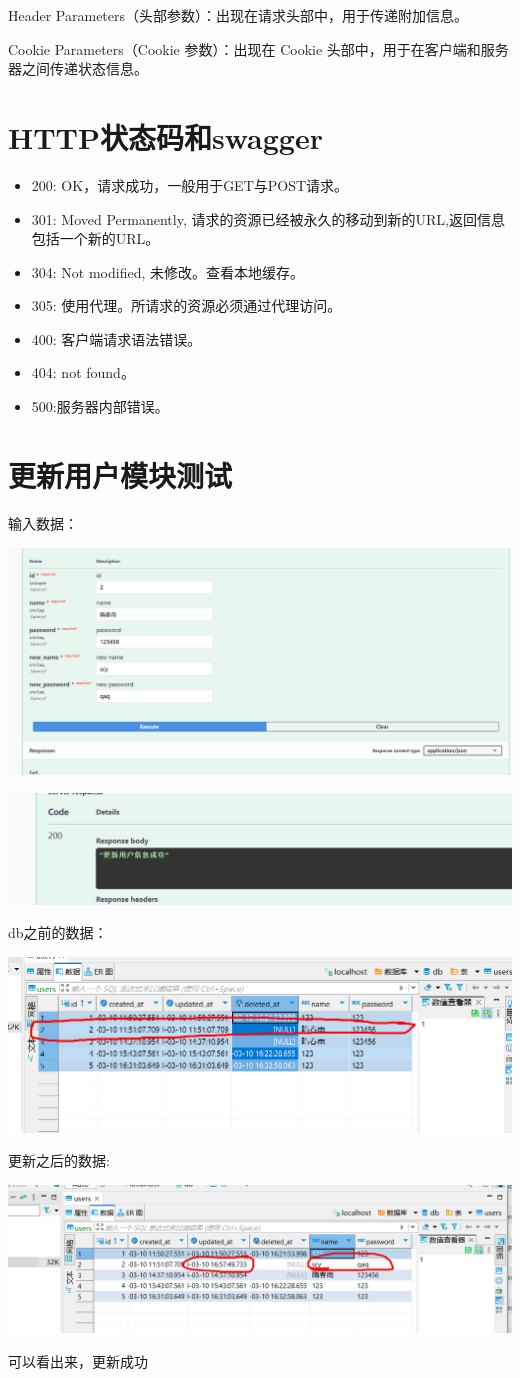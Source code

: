 \documentclass[12pt]{article}
\begin{document}
	Header Parameters（头部参数）：出现在请求头部中，用于传递附加信息。
	
	Cookie Parameters（Cookie 参数）：出现在 Cookie 头部中，用于在客户端和服务器之间传递状态信息。
	
	\section{HTTP状态码和swagger}
	\begin{itemize}
		\item 200: OK，请求成功，一般用于GET与POST请求。
		\item 301: Moved Permanently, 请求的资源已经被永久的移动到新的URL,返回信息包括一个新的URL。
		\item 304: Not modified, 未修改。查看本地缓存。
		\item 305: 使用代理。所请求的资源必须通过代理访问。
		\item 400: 客户端请求语法错误。
		\item 404: not found。
		\item 500:服务器内部错误。
	\end{itemize}
	
	\section{更新用户模块测试}
	输入数据：
	
	\includegraphics{12.png}
	
	\includegraphics{13.png}
	
	db之前的数据：
	
	\includegraphics{14.png}
	
	更新之后的数据:
	
	\includegraphics{15.png}
	
	可以看出来，更新成功
	
\end{document}
